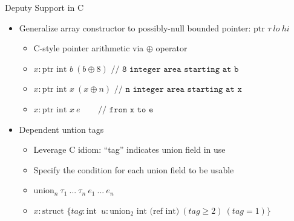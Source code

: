\documentclass[aspectratio=169]{beamer}
\begin{document}
\begin{frame}{Deputy}
Support in C
    \begin{itemize}
        \item Generalize array constructor to possibly-null bounded pointer: \emph{$\text{ptr }\tau \ lo\ hi$}
            \begin{itemize}
                \item C-style pointer arithmetic via $\oplus$ operator %
                \item $x:\text{ptr int } b\ (b \oplus 8)$ $\texttt{// 8 integer area starting at b}$
                \item $x:\text{ptr int } x\ (x \oplus n)$ $\texttt{// n integer area starting at x}$
                \item $x:\text{ptr int } x\ e\ \ \ \ \ \ \ \ $ $\texttt{// from x to e}$
            \end{itemize}
        \item Dependent untion tags
            \begin{itemize}
                \item Leverage C idiom: ``tag'' indicates union field in use
                \item Specify the condition for each union field to be usable
                \item \emph{$\text{union}_n\ \tau_1\ ...\ \tau_n\ e_1\ ...\ e_n$}
                \item $x:\text{struct }\{ tag:\text{int}\;\ u: \text{union}_2 \text{ int (ref int)} \ (\textit{tag} \geq 2)\ (\textit{tag} = 1) \}$
            \end{itemize}
    \end{itemize}
\end{frame}
\end{document}
